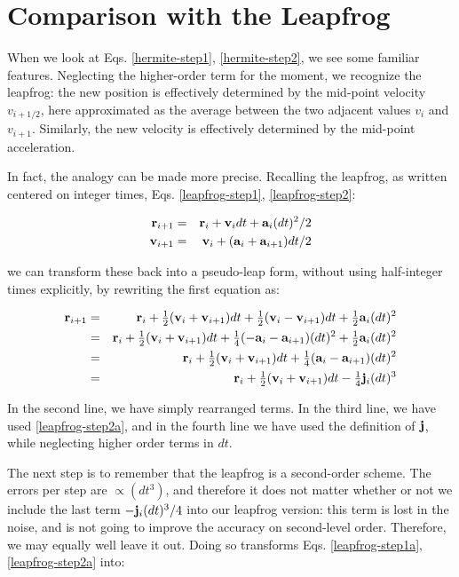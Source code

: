 \section{Comparison with the Leapfrog}

When we look at Eqs. \ref{hermite-step1}, \ref{hermite-step2}, we see
some familiar features.  Neglecting the higher-order term for the
moment, we recognize the leapfrog: the new position is effectively
determined by the mid-point velocity $v_{i+1/2}$, here approximated as
the average between the two adjacent values $v_{i}$ and $v_{i+1}$.
Similarly, the new velocity is effectively determined by the mid-point
acceleration.

In fact, the analogy can be made more precise.  Recalling the leapfrog,
as written centered on integer times, Eqs. \ref{leapfrog-step1},
\ref{leapfrog-step2}:

\begin{eqnarray}
\br_{i+1} & = & \br_i + \bv_{i} dt + \ba_{i} (dt)^2/2 \label{leapfrog-step1a}\\
\bv_{i+1} & = & \bv_i + (\ba_i + \ba_{i+1})dt / 2 \label{leapfrog-step2a}
\end{eqnarray}

\noindent
we can transform these back into a pseudo-leap form, without using
half-integer times explicitly, by rewriting the first equation as:

\begin{eqnarray}
\br_{i+1} & = & \br_i + \half(\bv_{i} + \bv_{i+1}) dt
                      + \half(\bv_{i} - \bv_{i+1}) dt
                      + \half\ba_{i} (dt)^2 \nonumber \\
	  & = & \br_i + \half(\bv_{i} + \bv_{i+1}) dt
                      + \quarter(-\ba_i-\ba_{i+1})(dt)^2
                      + \half\ba_{i}(dt)^2 \nonumber \\
	  & = & \br_i + \half(\bv_{i} + \bv_{i+1}) dt
                      + \quarter(\ba_i-\ba_{i+1})(dt)^2 \nonumber \\
	  & = & \br_i + \half(\bv_{i} + \bv_{i+1}) dt - \quarter\bj_i (dt)^3
                                                      \label{leapfrog-trick}
\end{eqnarray}

In the second line, we have simply rearranged terms.  In the third
line, we have used \ref{leapfrog-step2a}, and in the fourth line we
have used the definition of ${\bf j}$, while neglecting higher order terms
in $dt$.

The next step is to remember that the leapfrog is a second-order scheme.
The errors per step are $\propto(dt^3)$, and therefore it does not
matter whether or not we include the last term $-{\bf j}_i (dt)^3/4$ into
our leapfrog version: this term is lost in the noise, and is not going
to improve the accuracy on second-level order.  Therefore, we may
equally well leave it out.  Doing so transforms Eqs. \ref{leapfrog-step1a},
\ref{leapfrog-step2a} into:

